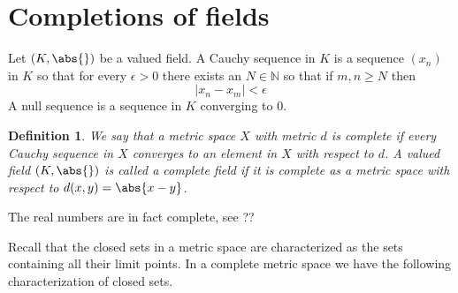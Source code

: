 \documentclass{article}
\newtheorem{definition}{Definition}[section]
\newcommand{\mbb}[1]{\mathbb{#1}}
\numberwithin{equation}{section}
\begin{document}
\section{Completions of fields}
Let $(K, \abs{})$ be a valued field. A Cauchy sequence in $K$ is a sequence $(x_n)$ in $K$ so that for every $\epsilon > 0$ there exists an $N \in \mbb N$ so that if $m,n \geq N$ then
$$|x_n - x_m| < \epsilon$$
A null sequence is a sequence in $K$ converging to 0.



\begin{definition}
    We say that a metric space $X$ with metric $d$ is complete if every Cauchy sequence in $X$ converges to an element in $X$ with respect to $d$. A valued field $(K, \abs{})$ is called a complete field if it is complete as a metric space with respect to $d(x,y) = \abs{x - y}$.
\end{definition}

The real numbers are in fact complete, see ?? 

Recall that the closed sets in a metric space are characterized as the sets containing all their limit points. In a complete metric space we have the following characterization of closed sets.

\end{document}
